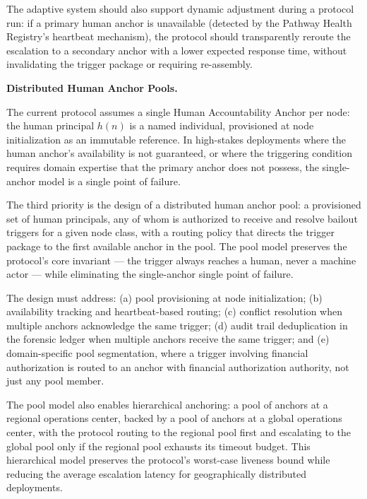The adaptive system should also support dynamic adjustment during a protocol run: if a primary human anchor is unavailable (detected by the Pathway Health Registry's heartbeat mechanism), the protocol should transparently reroute the escalation to a secondary anchor with a lower expected response time, without invalidating the trigger package or requiring re-assembly.

\bigskip
\noindent\textbf{Distributed Human Anchor Pools.}
\bigskip

The current protocol assumes a single Human Accountability Anchor per node: the human principal $h(n)$ is a named individual, provisioned at node initialization as an immutable reference. In high-stakes deployments where the human anchor's availability is not guaranteed, or where the triggering condition requires domain expertise that the primary anchor does not possess, the single-anchor model is a single point of failure.

The third priority is the design of a distributed human anchor pool: a provisioned set of human principals, any of whom is authorized to receive and resolve bailout triggers for a given node class, with a routing policy that directs the trigger package to the first available anchor in the pool. The pool model preserves the protocol's core invariant — the trigger always reaches a human, never a machine actor — while eliminating the single-anchor single point of failure.

The design must address: (a) pool provisioning at node initialization; (b) availability tracking and heartbeat-based routing; (c) conflict resolution when multiple anchors acknowledge the same trigger; (d) audit trail deduplication in the forensic ledger when multiple anchors receive the same trigger; and (e) domain-specific pool segmentation, where a trigger involving financial authorization is routed to an anchor with financial authorization authority, not just any pool member.

The pool model also enables hierarchical anchoring: a pool of anchors at a regional operations center, backed by a pool of anchors at a global operations center, with the protocol routing to the regional pool first and escalating to the global pool only if the regional pool exhausts its timeout budget. This hierarchical model preserves the protocol's worst-case liveness bound while reducing the average escalation latency for geographically distributed deployments.
